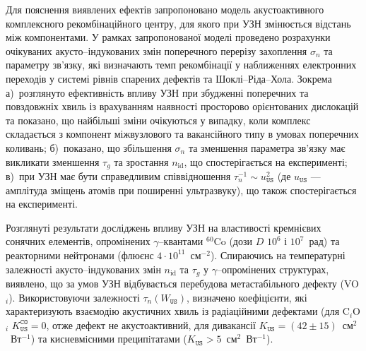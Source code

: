 Для пояснення виявлених ефектів запропоновано модель акустоактивного комплексного рекомбінаційного центру,
для якого при УЗН змінюється відстань між компонентами.
У рамках запропонованої моделі проведено розрахунки очікуваних акусто--індукованих змін поперечного перерізу захоплення $\sigma_{n}$ та параметру зв'язку,
які визначають темп рекомбінації у наближеннях електронних переходів у системі рівнів спарених дефектів та  Шоклі--Ріда--Хола.
Зокрема
а)~розглянуто ефективність впливу УЗН при збудженні поперечних та повздовжніх хвиль із врахуванням наявності просторово орієнтованих дислокацій та показано, що найбільші зміни очікуються у випадку, коли комплекс складається з компонент міжвузлового та вакансійного типу  в умовах поперечних коливань;
б)~показано, що збільшення $\sigma_{n}$ та зменшення параметра зв'язку має викликати зменшення $\tau_g$ та зростання $n_\mathrm{id}$, що спостерігається на експерименті;
в)~при УЗН має бути справедливим співвідношення $\tau_{n}^{-1}\sim u_{\mathtt{US}}^2$ (де $u_\mathtt{US}$ --- амплітуда зміщень атомів при поширенні ультразвуку), що також спостерігається на експерименті.

Розглянуті результати досліджень впливу УЗН на властивості кремнієвих сонячних елементів,
опромінених $\gamma$--квантами $^{60}$Co (дози $D$ $10^6$ і $10^7$~рад) та реакторними нейтронами (флюєнс $4\cdot10^{11}$~см$^{-2}$).
Спираючись на температурні залежності акусто--індукованих змін $n_\mathrm{id}$ та $\tau_{g}$ у $\gamma$--опромінених структурах, виявлено, що за умов УЗН відбувається  перебудова метастабільного дефекту (VO$_i$).
Використовуючи залежності $\tau_n(W_\mathtt{US})$,  визначено коефіцієнти, які характеризують взаємодію акустичних хвиль із радіаційними дефектами (для C$_i$O$_i$ $K_\mathtt{US}^\mathtt{CO}=0$, отже дефект не акустоактивний,
для дивакансії $K_\mathtt{US}=(42\pm15)$~см$^2$~Вт$^{-1}$)
та кисневмiсними преципiтатами ($K_\mathtt{US}>5$~см$^2$~Вт$^{-1}$).

